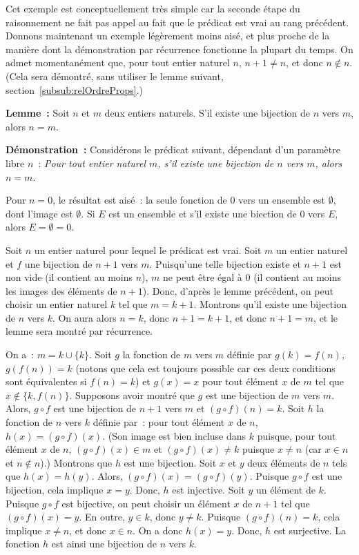 \medskip 

Cet exemple est conceptuellement très simple car la seconde étape du raisonnement ne fait pas appel au fait que le prédicat est vrai au rang précédent. 
Donnons maintenant un exemple légèrement moins aisé, et plus proche de la manière dont la démonstration par récurrence fonctionne la plupart du temps. 
On admet momentanément que, pour tout entier naturel $n$, $n+1 \neq n$, et donc $n \notin n$. 
(Cela sera démontré, sans utiliser le lemme suivant, section~\ref{subsub:relOrdreProps}.)

\medskip

\noindent\textbf{Lemme :} Soit $n$ et $m$ deux entiers naturels. S'il existe une bijection de $n$ vers $m$, alors $n=m$.

\medskip

\noindent\textbf{Démonstration :} Considérons le prédicat suivant, dépendant d'un paramètre libre $n$ : \textit{Pour tout entier naturel $m$, s'il existe une bijection de $n$ vers $m$, alors $n=m$.} 

    Pour $n=0$, le résultat est aisé : la seule fonction de $0$ vers un ensemble est $\emptyset$, dont l'image est $\emptyset$. 
    Si $E$ est un ensemble et s'il existe une biection de $0$ vers $E$, alors $E = \emptyset = 0$.

    Soit $n$ un entier naturel pour lequel le prédicat est vrai. 
    Soit $m$ un entier naturel et $f$ une bijection de $n+1$ vers $m$. 
    Puisqu'une telle bijection existe et $n+1$ est non vide (il contient au moins $n$), $m$ ne peut être égal à $0$ (il contient au moins les images des éléments de $n+1$). 
    Donc, d'après le lemme précédent, on peut choisir un entier naturel $k$ tel que $m = k+1$. 
    Montrons qu'il existe une bijection de $n$ vers $k$. 
    On aura alors $n=k$, donc $n+1=k+1$, et donc $n+1=m$, et le lemme sera montré par récurrence.

    On a : $m = k \cup \lbrace k \rbrace$. 
    Soit $g$ la fonction de $m$ vers $m$ définie par $g(k) = f(n)$, $g(f(n)) = k$ (notons que cela est toujours possible car ces deux conditions sont équivalentes si $f(n)=k$) et $g(x)=x$ pour tout élément $x$ de $m$ tel que $x \notin \lbrace k, f(n) \rbrace$. 
    Supposons avoir montré que $g$ est une bijection de $m$ vers $m$. 
    Alors, $g \circ f$ est une bijection de $n+1$ vers $m$ et $(g \circ f)(n) = k$. 
    Soit $h$ la fonction de $n$ vers $k$ définie par : pour tout élément $x$ de $n$, $h(x) = (g \circ f)(x)$. 
    (Son image est bien incluse dans $k$ puisque, pour tout élément $x$ de $n$, $(g \circ f)(x) \in m$ et $(g \circ f)(x) \neq k$ puisque $x \neq n$ (car $x \in n$ et $n \notin n$).)
    Montrons que $h$ est une bijection. 
    Soit $x$ et $y$ deux éléments de $n$ tels que $h(x)=h(y)$.
    Alors, $(g \circ f)(x) = (g \circ f)(y)$.
    Puisque  $g \circ f$ est une bijection, cela implique $x=y$.
    Donc, $h$ est injective. 
    Soit $y$ un élément de $k$. 
    Puisque $g \circ f$ est bijective, on peut choisir un élément $x$ de $n+1$ tel que $(g \circ f)(x) = y$. 
    En outre, $y \in k$, donc $y \neq k$. 
    Puisque $(g \circ f)(n)=k$, cela implique $x \neq n$, et donc $x \in n$. 
    On a donc $h(x) = y$. 
    Donc, $h$ est surjective.
    La fonction $h$ est ainsi une bijection de $n$ vers $k$.

